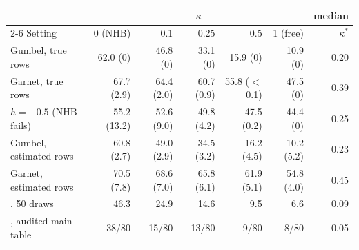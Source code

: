 \setlength{\tabcolsep}{4pt}%
\begin{tabular}{lrrrrrr}
\toprule
 & \multicolumn{5}{c}{$\kappa$} & median \\
\cmidrule(lr){2-6}
Setting & 0 (NHB) & 0.1 & 0.25 & 0.5 & 1 (free) & $\kappa^*$ \\
\midrule
Gumbel, true rows & 62.0 (0) & 46.8 (0) & 33.1 (0) & 15.9 (0) & 10.9 (0) & 0.20 \\
Garnet, true rows & 67.7 (2.9) & 64.4 (2.0) & 60.7 (0.9) & 55.8 ($<$0.1) & 47.5 (0) & 0.39 \\
\quad $h{=}{-}0.5$ (NHB fails) & 55.2 (13.2) & 52.6 (9.0) & 49.8 (4.2) & 47.5 (0.2) & 44.4 (0) & 0.25 \\
Gumbel, estimated rows & 60.8 (2.7) & 49.0 (2.9) & 34.5 (3.2) & 16.2 (4.5) & 10.2 (5.2) & 0.23 \\
Garnet, estimated rows & 70.5 (7.8) & 68.6 (7.0) & 65.8 (6.1) & 61.9 (5.1) & 54.8 (4.0) & 0.45 \\
\icu{}, 50 draws & 46.3 & 24.9 & 14.6 & 9.5 & 6.6 & 0.09 \\
\icu{}, audited main table & 38/80 & 15/80 & 13/80 & 9/80 & 8/80 & 0.05 \\
\bottomrule
\end{tabular}
